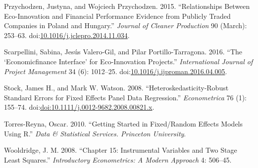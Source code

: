 \documentclass[12pt,]{article}
\begin{document}
\hypertarget{ref-PrzychodzenRelationshipsecoinnovationfinancial2015}{}
Przychodzen, Justyna, and Wojciech Przychodzen. 2015. ``Relationships
Between Eco-Innovation and Financial Performance Evidence from Publicly
Traded Companies in Poland and Hungary.'' \emph{Journal of Cleaner
Production} 90 (March): 253--63.
doi:\href{https://doi.org/10.1016/j.jclepro.2014.11.034}{10.1016/j.jclepro.2014.11.034}.

\hypertarget{ref-Scarpellinieconomicfinanceinterface2016}{}
Scarpellini, Sabina, Jesús Valero-Gil, and Pilar Portillo-Tarragona.
2016. ``The `Economicfinance Interface' for Eco-Innovation Projects.''
\emph{International Journal of Project Management} 34 (6): 1012--25.
doi:\href{https://doi.org/10.1016/j.ijproman.2016.04.005}{10.1016/j.ijproman.2016.04.005}.

\hypertarget{ref-Stock2008}{}
Stock, James H., and Mark W. Watson. 2008. ``Heteroskedasticity-Robust
Standard Errors for Fixed Effects Panel Data Regression.''
\emph{Econometrica} 76 (1): 155--74.
doi:\href{https://doi.org/doi:10.1111/j.0012-9682.2008.00821.x}{doi:10.1111/j.0012-9682.2008.00821.x}.

\hypertarget{ref-Torres-Reyna2010}{}
Torres-Reyna, Oscar. 2010. ``Getting Started in Fixed/Random Effects
Models Using R.'' \emph{Data \& Statistical Services. Princeton
University}.

\hypertarget{ref-Wooldridge2008}{}
Wooldridge, J. M. 2008. ``Chapter 15: Instrumental Variables and Two
Stage Least Squares.'' \emph{Introductory Econometrics: A Modern
Approach} 4: 506--45.
\end{document}
